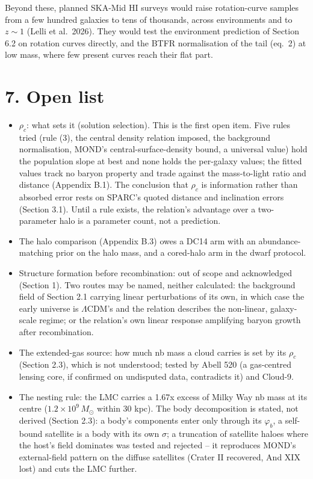 \documentclass[
  10pt,
]{article}
\begin{document}
Beyond these, planned SKA-Mid HI surveys would raise rotation-curve samples from a few hundred galaxies to tens of thousands, across environments and to $z\sim1$ (Lelli et al.~2026). They would test the environment prediction of Section 6.2 on rotation curves directly, and the BTFR normalisation of the tail (eq.~2) at low mass, where few present curves reach their flat part.



\section{7. Open list}\label{open-list}
\begin{itemize}
\item $\rho_c$: what sets it (solution selection). This is the first open item. Five rules tried (rule (3), the central density relation imposed, the background normalisation, MOND's central-surface-density bound, a universal value) hold the population slope at best and none holds the per-galaxy values; the fitted values track no baryon property and trade against the mass-to-light ratio and distance (Appendix B.1). The conclusion that $\rho_c$ is information rather than absorbed error rests on SPARC's quoted distance and inclination errors (Section 3.1). Until a rule exists, the relation's advantage over a two-parameter halo is a parameter count, not a prediction.
\item The halo comparison (Appendix B.3) owes a DC14 arm with an abundance-matching prior on the halo mass, and a cored-halo arm in the dwarf protocol.
\item Structure formation before recombination: out of scope and acknowledged (Section 1). Two routes may be named, neither calculated: the background field of Section 2.1 carrying linear perturbations of its own, in which case the early universe is $\Lambda$CDM's and the relation describes the non-linear, galaxy-scale regime; or the relation's own linear response amplifying baryon growth after recombination.
\item The extended-gas source: how much nb mass a cloud carries is set by its $\rho_c$ (Section 2.3), which is not understood; tested by Abell 520 (a gas-centred lensing core, if confirmed on undisputed data, contradicts it) and Cloud-9.
\item The nesting rule: the LMC carries a 1.67x excess of Milky Way nb mass at its centre ($1.2\times10^9\,M_\odot$ within 30 kpc). The body decomposition is stated, not derived (Section 2.3): a body's components enter only through its $\varphi_b$, a self-bound satellite is a body with its own $\sigma$; a truncation of satellite haloes where the host's field dominates was tested and rejected -- it reproduces MOND's external-field pattern on the diffuse satellites (Crater II recovered, And XIX lost) and cuts the LMC further.

\end{itemize}
\end{document}
